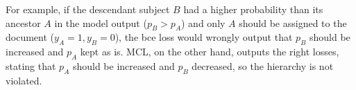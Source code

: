 For example, if the descendant subject $B$ had a higher probability than its ancestor $A$ in the model output ($p_B > p_A$) and only $A$ should be assigned to the document ($y_A = 1, y_B = 0$), the \acrshort{bce} loss would wrongly output that $p_B$ should be increased and $p_A$ kept as is. MCL, on the other hand, outputs the right losses, stating that $p_A$ should be increased and $p_B$ decreased, so the hierarchy is not violated.